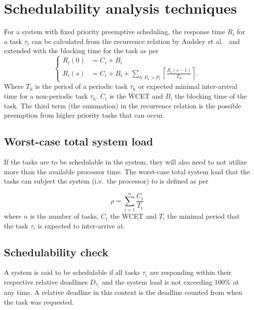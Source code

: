 \section{Schedulability analysis techniques}\label{theory:schedulability}
For a system with fixed priority preemptive scheduling, the response time $R_i$
for a task $\tau_i$ can be calculated from the recurrence relation by Audsley
et al.\ \cite{audsley93} and extended with the blocking time for the task as
per\cite{hardrealtimecomputingsystems}
\begin{equation}
    \begin{cases}
        R_{i}(0) &= C_i + B_i \\
        R_{i}(s) &= C_i + B_i + \sum\limits_{h: P_h > P_i} \left\lceil \frac{R_{i}(s-1)}{T_h} \right\rceil.
    \end{cases}
\end{equation}
Where $T_h$ is the period of a periodic task $\tau_h$ or expected minimal
inter-arrival time for a non-periodic task $\tau_h$. $C_i$ is the WCET and
$B_i$ the blocking time of the task. The third term (the summation) in the
recurrence relation is the possible preemption from higher priority tasks that
can occur.

\subsection{Worst-case total system load}
If the tasks are to be schedulable in the system, they will also need to not
utilize more than the available processor time. The worst-case total system
load that the tasks can subject the system (i.e.\ the processor) to is defined
as per~\cite{hardrealtimecomputingsystems}

\begin{equation}
    \rho = \sum^{n}_{i=1} \frac{C_i}{T_i}
\end{equation}
where $n$ is the number of tasks, $C_i$ the WCET and $T_i$ the
minimal period that the task $\tau_i$ is expected to inter-arrive at.

\subsection{Schedulability check}
A system is said to be schedulable if all tasks $\tau_i$ are responding within
their respective relative deadlines $D_{\tau_i}$ and the system load is not exceeding
100\% at any time. A relative deadline in this context is the deadline counted
from when the task was requested.

